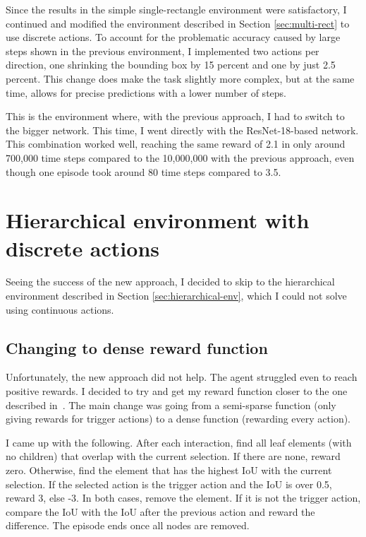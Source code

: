 \documentclass[
  digital,     %
  oneside,     %
  nosansbold,  %
  nocolorbold, %
  lof,         %
  lot,         %
]{fithesis4}
\begin{document}
Since the results in the simple single-rectangle environment were satisfactory, I continued and modified the environment described in Section \ref{sec:multi-rect} to use discrete actions. To account for the problematic accuracy caused by large steps shown in the previous environment, I implemented two actions per direction, one shrinking the bounding box by 15 percent and one by just 2.5 percent. This change does make the task slightly more complex, but at the same time, allows for precise predictions with a lower number of steps.

This is the environment where, with the previous approach, I had to switch to the bigger network. This time, I went directly with the ResNet-18-based network. This combination worked well, reaching the same reward of 2.1 in only around 700,000 time steps compared to the 10,000,000 with the previous approach, even though one episode took around 80 time steps compared to 3.5.

\section{Hierarchical environment with discrete actions}

Seeing the success of the new approach, I decided to skip to the hierarchical environment described in Section \ref{sec:hierarchical-env}, which I could not solve using continuous actions.

\subsection{Changing to dense reward function}

Unfortunately, the new approach did not help. The agent struggled even to reach positive rewards. I decided to try and get my reward function closer to the one described in~\cite{iterative_od_with_rl}. The main change was going from a semi-sparse function (only giving rewards for trigger actions) to a dense function (rewarding every action).

I came up with the following. After each interaction, find all leaf elements (with no children) that overlap with the current selection. If there are none, reward zero. Otherwise, find the element that has the highest IoU with the current selection. If the selected action is the trigger action and the IoU is over 0.5, reward 3, else -3. In both cases, remove the element. If it is not the trigger action, compare the IoU with the IoU after the previous action and reward the difference. The episode ends once all nodes are removed.
\end{document}
